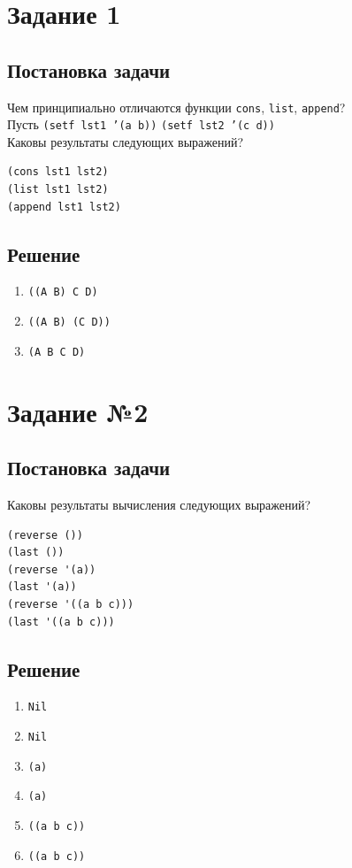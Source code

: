 \section*{Задание 1}
\subsection*{Постановка задачи}
Чем принципиально отличаются функции \texttt{cons}, \texttt{list}, \texttt{append}?\\
\indent Пусть \texttt{(setf lst1 '(a b))} \texttt{(setf lst2 '(c d))}\\
\indent Каковы результаты следующих выражений?

\begin{lstlisting}
(cons lst1 lst2)
(list lst1 lst2)
(append lst1 lst2)
\end{lstlisting}

\subsection*{Решение}
\begin{enumerate}
	\item \texttt{((A B) C D)}
	\item \texttt{((A B) (C D))}
	\item \texttt{(A B C D)}
\end{enumerate}

\section*{Задание №2}
\subsection*{Постановка задачи}
Каковы результаты вычисления следующих выражений?

\begin{lstlisting}
(reverse ())
(last ())
(reverse '(a))
(last '(a))
(reverse '((a b c)))
(last '((a b c)))
\end{lstlisting}


\subsection*{Решение}
\begin{enumerate}
	\item \texttt{Nil}
	\item \texttt{Nil}
	\item \texttt{(a)}
	\item \texttt{(a)}
	\item \texttt{((a b c))}
	\item \texttt{((a b c))}
\end{enumerate}

